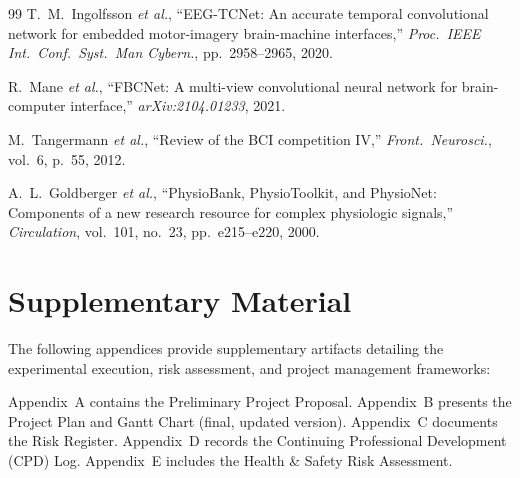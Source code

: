 \documentclass[12pt, a4paper]{article}
\begin{document}
\begin{thebibliography}{99}
T.~M.~Ingolfsson \emph{et al.}, ``EEG-TCNet: An accurate temporal convolutional network for embedded motor-imagery brain-machine interfaces,'' \textit{Proc.\ IEEE Int.\ Conf.\ Syst.\ Man Cybern.}, pp.~2958--2965, 2020.

R.~Mane \emph{et al.}, ``FBCNet: A multi-view convolutional neural network for brain-computer interface,'' \textit{arXiv:2104.01233}, 2021.

M.~Tangermann \emph{et al.}, ``Review of the BCI competition IV,'' \textit{Front.\ Neurosci.}, vol.~6, p.~55, 2012.

A.~L.~Goldberger \emph{et al.}, ``PhysioBank, PhysioToolkit, and PhysioNet: Components of a new research resource for complex physiologic signals,'' \textit{Circulation}, vol.~101, no.~23, pp.~e215--e220, 2000.
\end{thebibliography}

\newpage
\section*{Supplementary Material}

The following appendices provide supplementary artifacts detailing the experimental execution, risk assessment, and project management frameworks:

Appendix~A contains the Preliminary Project Proposal. Appendix~B presents the Project Plan and Gantt Chart (final, updated version). Appendix~C documents the Risk Register. Appendix~D records the Continuing Professional Development (CPD) Log. Appendix~E includes the Health \& Safety Risk Assessment.
\end{document}
